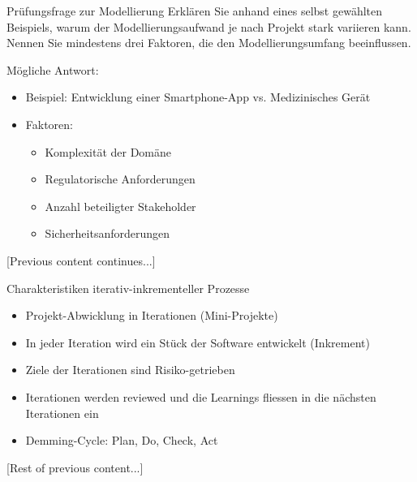 \begin{example}{Prüfungsfrage zur Modellierung}
Erklären Sie anhand eines selbst gewählten Beispiels, warum der Modellierungsaufwand je nach Projekt stark variieren kann. Nennen Sie mindestens drei Faktoren, die den Modellierungsumfang beeinflussen.

Mögliche Antwort:
\begin{itemize}
    \item Beispiel: Entwicklung einer Smartphone-App vs. Medizinisches Gerät
    \item Faktoren:
    \begin{itemize}
        \item Komplexität der Domäne
        \item Regulatorische Anforderungen
        \item Anzahl beteiligter Stakeholder
        \item Sicherheitsanforderungen
    \end{itemize}
\end{itemize}
\end{example}

[Previous content continues...]

\begin{concept}{Charakteristiken iterativ-inkrementeller Prozesse}
\begin{itemize}
    \item Projekt-Abwicklung in Iterationen (Mini-Projekte)
    \item In jeder Iteration wird ein Stück der Software entwickelt (Inkrement)
    \item Ziele der Iterationen sind Risiko-getrieben
    \item Iterationen werden reviewed und die Learnings fliessen in die nächsten Iterationen ein
    \item Demming-Cycle: Plan, Do, Check, Act
\end{itemize}
\end{concept}

[Rest of previous content...]

